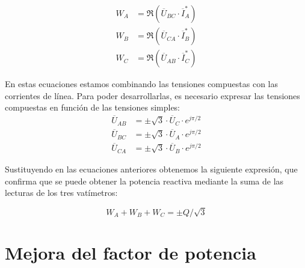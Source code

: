 \begin{align*}
  W_A &= \Re(\overline{U}_{BC} \cdot \overline{I}^*_A)\\
  W_B &= \Re(\overline{U}_{CA} \cdot \overline{I}^*_B)\\
  W_C &= \Re(\overline{U}_{AB} \cdot \overline{I}^*_C)        
\end{align*}

En estas ecuaciones estamos combinando las tensiones compuestas con
las corrientes de línea. Para poder desarrollarlas, es necesario
expresar las tensiones compuestas en función de las tensiones simples:
\begin{align*}
  \overline{U}_{AB} &= \pm \sqrt{3} \cdot \overline{U}_C \cdot e^{j\pi/2}\\
  \overline{U}_{BC} &= \pm \sqrt{3} \cdot \overline{U}_A \cdot e^{j\pi/2}\\
  \overline{U}_{CA} &= \pm \sqrt{3} \cdot \overline{U}_B \cdot e^{j\pi/2}
\end{align*}

Sustituyendo en las ecuaciones anteriores obtenemos la siguiente
expresión, que confirma que se puede obtener la potencia reactiva
mediante la suma de las lecturas de los tres vatímetros:

\begin{equation*}
  W_A + W_B + W_C = \pm Q/\sqrt{3}
\end{equation*}

\section{Mejora del factor de potencia}
		
		
		
